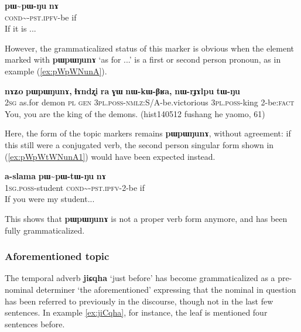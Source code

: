 \documentclass[oldfontcommands,oneside,a4paper,11pt]{article}
\newcommand{\ipa}[1]{\mbox{\phon\textbf{#1}}} %
\newcommand{\tld}{\textasciitilde{}}
\begin{document}
\begin{exe}
\ex \label{ex:pWpWNunA1}
\gll \ipa{pɯ\tld{}pɯ-ŋu} \ipa{nɤ} \\
\textsc{cond}\tld{}-\textsc{pst.ipfv}-be if \\
\glt If it is ...
\end{exe}

However, the grammaticalized status of this marker is obvious when the element marked with \ipa{pɯpɯŋunɤ} `as for ...' is a first or second person pronoun, as in example (\ref{ex:pWpWNunA}).

\begin{exe}
\ex \label{ex:pWpWNunA}
\gll \ipa{nɤʑo}	\ipa{pɯpɯŋunɤ,}	\ipa{ɬɤndʐi}	\ipa{ra}	\ipa{ɣɯ}	\ipa{nɯ-kɯ-βʁa,}	\ipa{nɯ-rɟɤlpu}	\ipa{tɯ-ŋu} \\
\textsc{2sg} as.for demon \textsc{pl} \textsc{gen} \textsc{3pl.poss}-\textsc{nmlz}:S/A-be.victorious \textsc{3pl.poss}-king 2-be:\textsc{fact} \\
\glt You, you are the king of the demons. (hist140512 fushang he yaomo, 61)
\end{exe}
Here, the form of the topic markers remains \ipa{pɯpɯŋunɤ}, without agreement: if this still were a conjugated verb, the second person singular form shown in (\ref{ex:pWpWtWNunA1}) would have been expected instead.

\begin{exe}
\ex \label{ex:pWpWtWNunA1}
\gll \ipa{a-slama} \ipa{pɯ\tld{}pɯ-tɯ-ŋu} \ipa{nɤ} \\
\textsc{1sg.poss}-student \textsc{cond}\tld{}-\textsc{pst.ipfv}-2-be if \\
\glt If you were my student...
\end{exe}

This shows that \ipa{pɯpɯŋunɤ} is not a proper verb form anymore, and has been fully grammaticalized.

\subsubsection{Aforementioned topic}
The temporal adverb \ipa{jiɕqha} `just before' has become grammaticalized as a pre-nominal determiner `the aforementioned' expressing that the nominal in question has been referred to previously in the discourse, though not in the last few sentences. In example \ref{ex:jiCqha}, for instance, the leaf is mentioned four sentences before.
\end{document}
